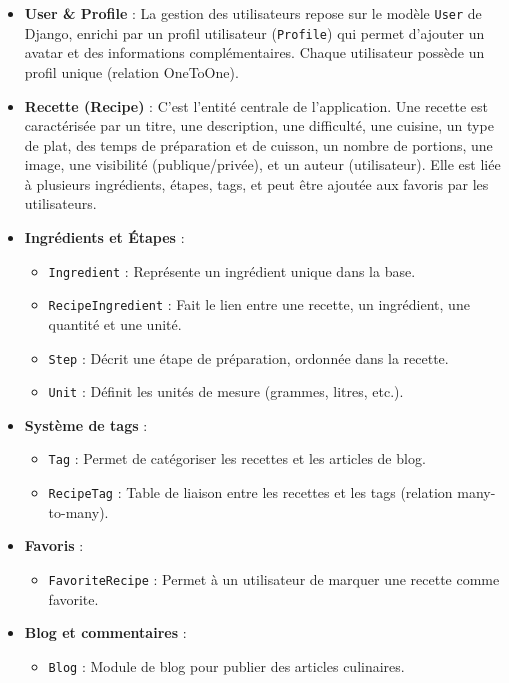 \documentclass[12pt,a4paper]{report}
\begin{document}
\begin{itemize}
    \item \textbf{User \& Profile} : La gestion des utilisateurs repose sur le modèle \texttt{User} de Django, enrichi par un profil utilisateur (\texttt{Profile}) qui permet d’ajouter un avatar et des informations complémentaires. Chaque utilisateur possède un profil unique (relation OneToOne).
    \item \textbf{Recette (Recipe)} : C’est l’entité centrale de l’application. Une recette est caractérisée par un titre, une description, une difficulté, une cuisine, un type de plat, des temps de préparation et de cuisson, un nombre de portions, une image, une visibilité (publique/privée), et un auteur (utilisateur). Elle est liée à plusieurs ingrédients, étapes, tags, et peut être ajoutée aux favoris par les utilisateurs.
    \item \textbf{Ingrédients et Étapes} :
    \begin{itemize}
        \item \texttt{Ingredient} : Représente un ingrédient unique dans la base.
        \item \texttt{RecipeIngredient} : Fait le lien entre une recette, un ingrédient, une quantité et une unité.
        \item \texttt{Step} : Décrit une étape de préparation, ordonnée dans la recette.
        \item \texttt{Unit} : Définit les unités de mesure (grammes, litres, etc.).
    \end{itemize}
    \item \textbf{Système de tags} :
    \begin{itemize}
        \item \texttt{Tag} : Permet de catégoriser les recettes et les articles de blog.
        \item \texttt{RecipeTag} : Table de liaison entre les recettes et les tags (relation many-to-many).
    \end{itemize}
    \item \textbf{Favoris} :
    \begin{itemize}
        \item \texttt{FavoriteRecipe} : Permet à un utilisateur de marquer une recette comme favorite.
    \end{itemize}
    \item \textbf{Blog et commentaires} :
    \begin{itemize}
        \item \texttt{Blog} : Module de blog pour publier des articles culinaires.

\end{itemize}
\end{itemize}
\end{document}
